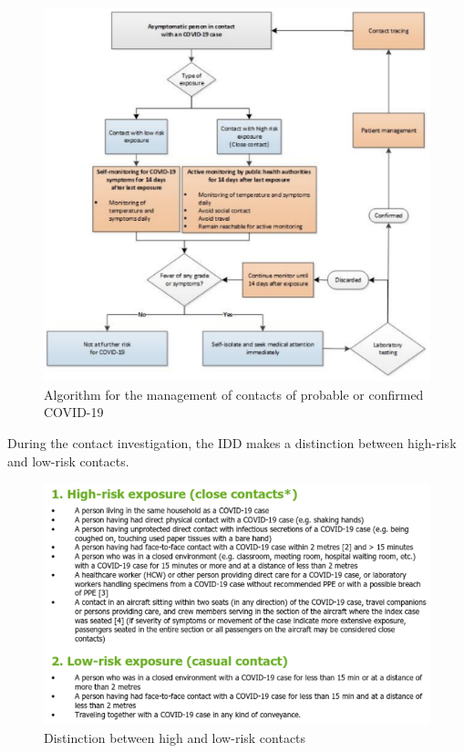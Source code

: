 \begin{center}
	\begin{figure}[H]
	    \includegraphics[scale=0.7]{imgs/algo_eu.png}
 		\caption{Algorithm for the management of contacts of probable or confirmed COVID-19}
 		\label{fig:algo_eu}
	\end{figure}
\end{center}

During the contact investigation, the IDD makes a distinction between high-risk and low-risk contacts. 

\begin{center}
	\begin{figure}[H]
	    \includegraphics[scale=0.5]{imgs/hi_low.png}
 		\caption{Distinction between high and low-risk contacts}
 		\label{fig:hi_low}
	\end{figure}
\end{center}

